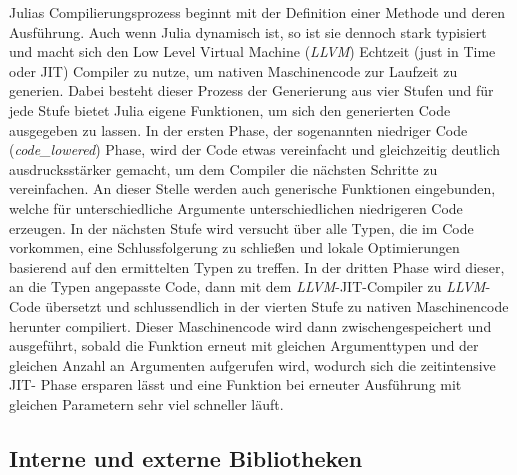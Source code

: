 \documentclass[proseminar,german,utf8]{zihpub}
\begin{document}
Julias Compilierungsprozess beginnt mit der Definition einer Methode und deren Ausführung. Auch wenn Julia dynamisch ist, so ist sie dennoch stark typisiert und macht sich den Low Level Virtual Machine (\textit{LLVM}) Echtzeit (just in Time oder JIT) Compiler zu nutze, um nativen Maschinencode zur Laufzeit zu generien. Dabei besteht dieser Prozess der Generierung aus vier Stufen und für jede Stufe bietet Julia eigene Funktionen, um sich den generierten Code ausgegeben zu lassen. In der ersten Phase, der sogenannten niedriger Code (\textit{code\_lowered}) Phase, wird der Code etwas vereinfacht und gleichzeitig deutlich ausdrucksstärker gemacht, um dem Compiler die nächsten Schritte zu vereinfachen. An dieser Stelle werden auch generische Funktionen eingebunden, welche für unterschiedliche Argumente unterschiedlichen niedrigeren Code erzeugen. In der nächsten Stufe wird versucht über alle Typen, die im Code vorkommen, eine Schlussfolgerung zu schließen und lokale Optimierungen basierend auf den ermittelten Typen zu treffen. In der dritten Phase wird dieser, an die Typen angepasste Code, dann mit dem \textit{LLVM}-JIT-Compiler zu \textit{LLVM}-Code übersetzt  und schlussendlich in der vierten Stufe zu nativen Maschinencode herunter compiliert. Dieser Maschinencode wird dann zwischengespeichert und ausgeführt, sobald die Funktion erneut mit gleichen Argumenttypen und der gleichen Anzahl an Argumenten aufgerufen wird, wodurch sich die zeitintensive JIT- Phase ersparen lässt und eine Funktion bei erneuter Ausführung mit gleichen Parametern sehr viel schneller läuft.~\cite{JuliaLangDocumentation}~\cite{CompilerYoutube}~\cite{StaticJuliaComputing}

\subsection{Interne und externe Bibliotheken}
\end{document}
